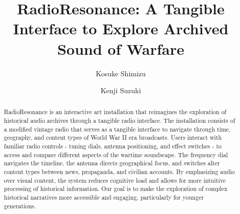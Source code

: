 \documentclass[sigconf,authordraft]{acmart}
\begin{document}
\title{RadioResonance: A Tangible Interface to Explore Archived Sound of Warfare}

\author{Kosuke Shimizu}
\author{Kenji Suzuki}

\renewcommand{\shortauthors}{Shimizu}

\begin{abstract}
RadioResonance is an interactive art installation that reimagines the exploration of historical audio archives through a tangible radio interface. The installation consists of a modified vintage radio that serves as a tangible interface to navigate through time, geography, and content types of World War II era broadcasts. Users interact with familiar radio controls - tuning dials, antenna positioning, and effect switches - to access and compare different aspects of the wartime soundscape. The frequency dial navigates the timeline, the antenna directs geographical focus, and switches alter content types between news, propaganda, and civilian accounts. By emphasizing audio over visual content, the system reduces cognitive load and allows for more intuitive processing of historical information. Our goal is to make the exploration of complex historical narratives more accessible and engaging, particularly for younger generations.
\end{abstract}
\end{document}
